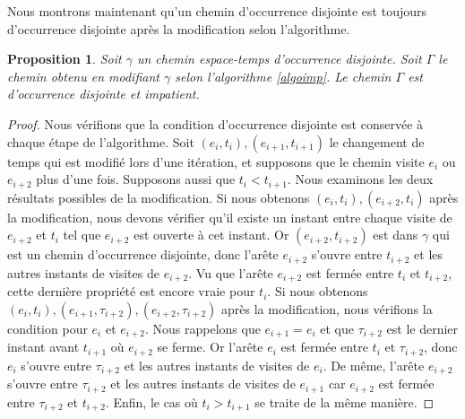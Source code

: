 \documentclass[titlepage,a4paper,12pt]{article}
\newcounter{d}
\newcounter{t}
\newcounter{p}
\newcounter{c}
\newcounter{a}
\newcounter{l}
\newtheorem{prop}[p]{Proposition}
\begin{document}
Nous montrons maintenant qu'un chemin d'occurrence disjointe est toujours d'occurrence disjointe après la modification selon l'algorithme.
\begin{prop} \label{imp}Soit $\gamma$ un chemin espace-temps d'occurrence disjointe. Soit $\Gamma$ le chemin obtenu en modifiant $\gamma$ selon l'algorithme \ref{algoimp}. Le chemin $\Gamma$ est d'occurrence disjointe et impatient.
\end{prop}
\begin{proof}
Nous vérifions que la condition d'occurrence disjointe est conservée à chaque étape de l'algorithme. Soit $(e_i,t_i),(e_{i+1},t_{i+1})$ le changement de temps qui est modifié lors d'une itération, et supposons que le chemin visite $e_i$ ou $e_{i+2}$ plus d'une fois. Supposons aussi que $t_i< t_{i+1}$. Nous examinons les deux résultats possibles de la modification. Si nous obtenons $(e_i,t_i),(e_{i+2},t_i)$ après la modification, nous devons vérifier qu'il existe un instant entre chaque visite de $e_{i+2}$ et $t_i$ tel que $e_{i+2}$ est ouverte à cet instant. Or $(e_{i+2},t_{i+2})$ est dans $\gamma$ qui est un chemin d'occurrence disjointe, donc l'arête $e_{i+2}$ s'ouvre entre $t_{i+2}$ et les autres instants de visites de $e_{i+2}$. Vu que l'arête $e_{i+2}$ est fermée entre $t_i$ et $t_{i+2}$, cette dernière propriété est encore vraie pour $t_i$. Si nous obtenons $(e_i,t_i),(e_{i+1},\tau_{i+2}),(e_{i+2},\tau_{i+2})$ après la modification, nous vérifions la condition pour $e_i$ et $e_{i+2}$. Nous rappelons que $e_{i+1}= e_i$ et que $\tau_{i+2}$ est le dernier instant avant $t_{i+1}$ où $e_{i+2}$ se ferme. Or l'arête $e_i$ est fermée entre $t_i$ et $\tau_{i+2}$, donc $e_i$ s'ouvre entre $\tau_{i+2}$ et les autres instants de visites de $e_i$. De même, l'arête $e_{i+2}$ s'ouvre entre $\tau_{i+2}$ et les autres instants de visites de $e_{i+1}$ car $e_{i+2}$ est fermée entre $\tau_{i+2}$ et $t_{i+2}$. Enfin, le cas où $t_i> t_{i+1}$ se traite de la même manière.
\end{proof}
\end{document}
